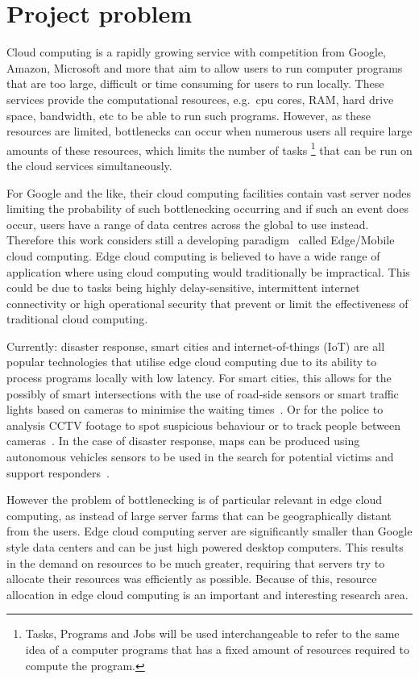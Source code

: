 \chapter{Project problem}\label{ch:project-problem}
Cloud computing is a rapidly growing service with competition from Google, Amazon, Microsoft and more that aim to
allow users to run computer programs that are too large, difficult or time consuming for users to run locally.
These services provide the computational resources, e.g.\ cpu cores, RAM, hard drive space, bandwidth, etc
to be able to run such programs. However, as these resources are limited, bottlenecks can occur when
numerous users all require large amounts of these resources, which limits the number of tasks
\footnote{Tasks, Programs and Jobs will be used interchangeable to refer to the same idea of a computer programs that
has a fixed amount of resources required to compute the program.} that can be run on the cloud services simultaneously.

For Google and the like, their cloud computing facilities contain vast server nodes limiting the probability of such
bottlenecking occurring and if such an event does occur, users have a range of data centres across the global to use instead.
Therefore this work considers still a developing paradigm~\citep{mobile_edge_survey} called Edge/Mobile cloud computing.
Edge cloud computing is believed to have a wide range of application where using cloud computing would traditionally
be impractical. This could be due to tasks being highly delay-sensitive, intermittent internet connectivity
or high operational security that prevent or limit the effectiveness of traditional cloud computing.

Currently: disaster response, smart cities and internet-of-things (IoT) are all popular technologies that utilise
edge cloud computing due to its ability to process programs locally with low latency. For smart cities, this
allows for the possibly of smart intersections with the use of road-side sensors or smart traffic lights based
on cameras to minimise the waiting times~\citep{smart_cities_traffic_lights}. Or for the police to analysis
CCTV footage to spot suspicious behaviour or to track people between cameras~\citep{Sreenu2019}. In the case
of disaster response, maps can be produced using autonomous vehicles sensors to be used in the search for potential
victims and support responders~\citep{smart_disaster_management}.

However the problem of bottlenecking is of particular relevant in edge cloud computing, as instead of large server farms
that can be geographically distant from the users. Edge cloud computing server are significantly smaller than Google
style data centers and can be just high powered desktop computers. This results in the demand on resources to be much
greater, requiring that servers try to allocate their resources was efficiently as possible.
Because of this, resource allocation in edge cloud computing is an important and interesting research area.

